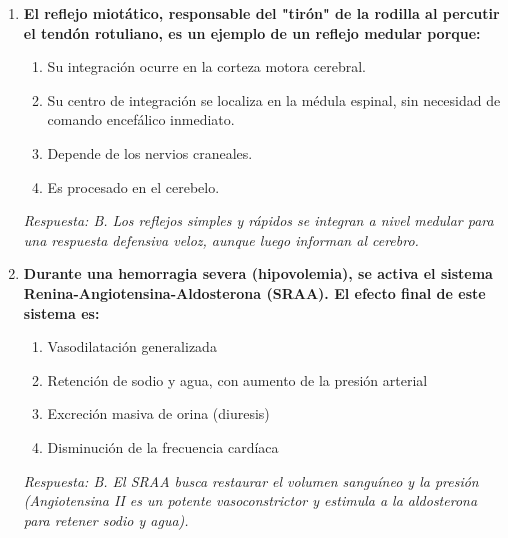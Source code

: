 \documentclass[spanish,letterpaper,oneside]{article}
\begin{document}
\begin{enumerate}[label=\textbf{\arabic*.}]
    \item \textbf{El reflejo miotático, responsable del "tirón" de la rodilla al percutir el tendón rotuliano, es un ejemplo de un reflejo medular porque:}
    \begin{enumerate}
        \item[A)] Su integración ocurre en la corteza motora cerebral.
        \item[B)] Su centro de integración se localiza en la médula espinal, sin necesidad de comando encefálico inmediato.
        \item[C)] Depende de los nervios craneales.
        \item[D)] Es procesado en el cerebelo.
    \end{enumerate}
    \textit{Respuesta: B. Los reflejos simples y rápidos se integran a nivel medular para una respuesta defensiva veloz, aunque luego informan al cerebro.}

    \item \textbf{Durante una hemorragia severa (hipovolemia), se activa el sistema Renina-Angiotensina-Aldosterona (SRAA). El efecto final de este sistema es:}
    \begin{enumerate}
        \item[A)] Vasodilatación generalizada
        \item[B)] Retención de sodio y agua, con aumento de la presión arterial
        \item[C)] Excreción masiva de orina (diuresis)
        \item[D)] Disminución de la frecuencia cardíaca
    \end{enumerate}
    \textit{Respuesta: B. El SRAA busca restaurar el volumen sanguíneo y la presión (Angiotensina II es un potente vasoconstrictor y estimula a la aldosterona para retener sodio y agua).}

\end{enumerate}
\end{document}
